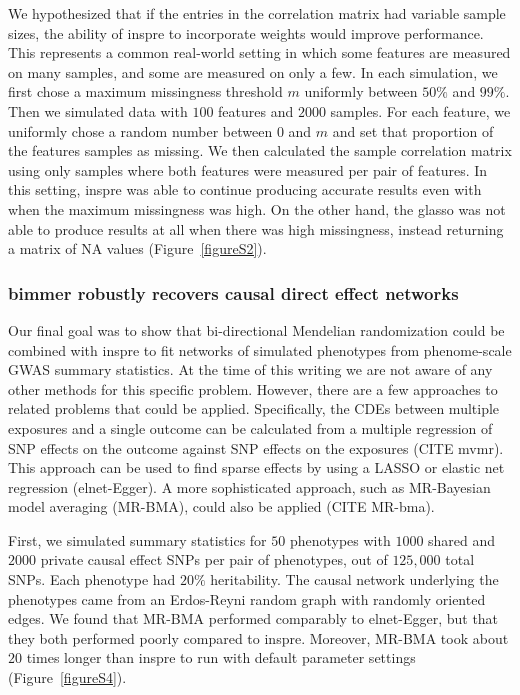 \documentclass{article}
\begin{document}
We hypothesized that if the entries in the correlation matrix had variable
sample sizes, the ability of inspre to incorporate weights would improve
performance. This represents a common real-world setting in
which some features are measured on many samples, and some are measured
on only a few. In each simulation, we first chose a maximum missingness
threshold $m$ uniformly between $50\%$ and $99\%$. Then we simulated data with
$100$ features and $2000$ samples. For each feature, we uniformly chose
a random number between $0$ and $m$ and set that proportion of the features
samples as missing. We then calculated the sample correlation matrix using only
samples where both features were measured per pair of features.
In this setting, inspre was able to continue producing accurate
results even with when the maximum missingness was high. On the other
hand, the glasso was not able to produce results at all when there was high
missingness, instead returning a matrix of NA values 
(Figure~\ref{figureS2}).



\subsubsection*{bimmer robustly recovers causal direct effect networks}

Our final goal was to show that bi-directional Mendelian randomization
could be combined with inspre to fit networks of simulated phenotypes
from phenome-scale GWAS summary statistics. At the time of this writing
we are not aware of any other methods for this specific problem. However,
there are a few approaches to related problems that could be applied.
Specifically, the CDEs between multiple exposures and a single outcome
can be calculated from a multiple regression of SNP effects on the outcome
against SNP effects on the exposures (CITE mvmr). This approach can be used
to find sparse effects by using a LASSO or elastic net regression (elnet-Egger). A more
sophisticated approach, such as MR-Bayesian model averaging (MR-BMA), could also be
applied (CITE MR-bma). 

First, we simulated summary
statistics for $50$ phenotypes with $1000$ shared and $2000$ private
causal effect SNPs per pair of phenotypes, out of $125,000$ total SNPs. Each
phenotype had $20\%$ heritability. The causal
network underlying the phenotypes came from an Erdos-Reyni random graph with
randomly oriented edges. We found that MR-BMA performed comparably to
elnet-Egger, but that they both performed poorly compared to inspre.
Moreover, MR-BMA took about $20$ times longer than inspre to run with
default parameter settings (Figure~\ref{figureS4}).
\end{document}
